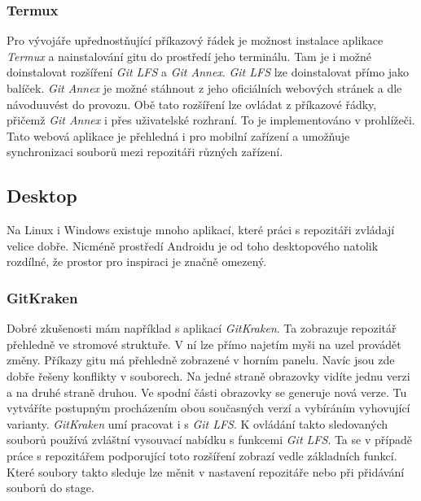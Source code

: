         \subsubsection{Termux}
        Pro vývojáře upřednostňující příkazový řádek je možnost instalace aplikace \emph{Termux} a nainstalování gitu do prostředí jeho terminálu. Tam je i možné doinstalovat rozšíření \emph{Git LFS} a \emph{Git Annex}. \emph{Git LFS} lze doinstalovat přímo jako balíček. \emph{Git Annex} je možné stáhnout z jeho oficiálních webových stránek a dle návoduuvést do provozu. Obě tato rozšíření lze ovládat z příkazové řádky, přičemž \emph{Git Annex} i přes uživatelské rozhraní. To je implementováno v prohlížeči. Tato webová aplikace je přehledná i pro mobilní zařízení a umožňuje synchronizaci souborů mezi repozitáři různých zařízení.

    \subsection {Desktop}
    Na Linux i Windows existuje mnoho aplikací, které práci s repozitáři zvládají velice dobře. Nicméně prostředí Androidu je od toho desktopového natolik rozdílné, že prostor pro inspiraci je značně omezený.
        \subsubsection{GitKraken}
        Dobré zkušenosti mám například s aplikací \emph{GitKraken}. Ta zobrazuje repozitář přehledně ve stromové struktuře. V ní lze přímo najetím myši na uzel provádět změny. Příkazy gitu má přehledně zobrazené v horním panelu. Navíc jsou zde dobře řešeny konflikty v souborech. Na jedné straně obrazovky vidíte jednu verzi a na druhé straně druhou. Ve spodní části obrazovky se generuje nová verze. Tu vytváříte postupným procházením obou současných verzí a vybíráním vyhovující varianty. \emph{GitKraken} umí pracovat i s \emph{Git LFS}. K ovládání takto sledovaných souborů používá zvláštní vysouvací nabídku s funkcemi \emph{Git LFS}. Ta se v případě práce s repozitářem podporující toto rozšíření zobrazí vedle základních funkcí. Které soubory takto sleduje lze měnit v nastavení repozitáře nebo při přidávání souborů do stage.

